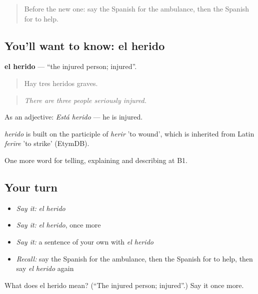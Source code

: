 \label{lesson:ES-C525-herido}



\begin{quote}
Before the new one: say the Spanish for the ambulance, then the Spanish for to help.
\end{quote}

\subsection*{You'll want to know: el herido}
\textbf{el herido} — \textquotedblleft{}the injured person; injured\textquotedblright{}.

\begin{quote}
Hay tres heridos graves.
\end{quote}

\begin{quote}
\emph{There are three people seriously injured.}
\end{quote}

As an adjective: \emph{Está herido} — he is injured.

\begin{cousinweb}
\emph{herido} is built on the participle of \emph{herir} 'to wound', which is inherited from Latin \emph{ferīre} 'to strike' (EtymDB).
\end{cousinweb}

\begin{grammarlens}[title={What you've built}]
One more word for telling, explaining and describing at B1.
\end{grammarlens}

\subsection*{Your turn}
\begin{itemize}
\raggedright
  \item \emph{Say it:} \emph{el herido}
  \item \emph{Say it:} \emph{el herido}, once more
  \item \emph{Say it:} a sentence of your own with \emph{el herido}
  \item \emph{Recall:} say the Spanish for the ambulance, then the Spanish for to help, then say \emph{el herido} again
\end{itemize}

\begin{tcolorbox}[breakable,colback=teal!4,colframe=teal!35!black,title={Before you move on}]
What does el herido mean? (\textquotedblleft{}The injured person; injured\textquotedblright{}.) Say it once more.
\end{tcolorbox}
